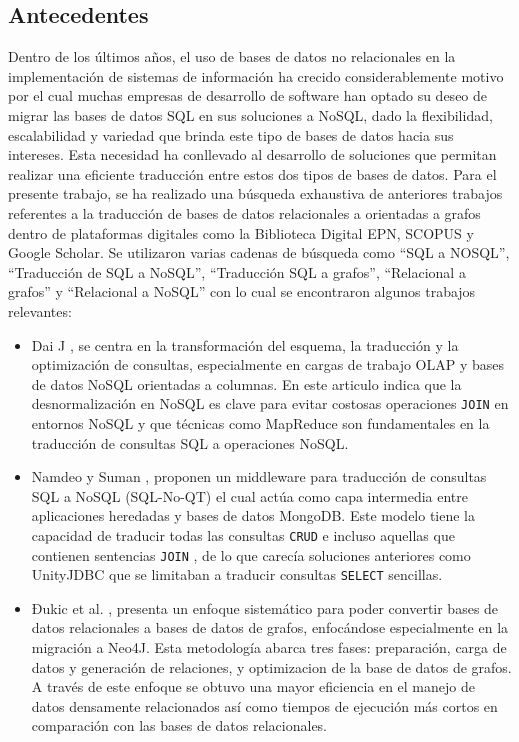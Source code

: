 \subsection{Antecedentes}
Dentro de los últimos años, el uso de bases de datos no relacionales en la implementación de sistemas de información ha crecido considerablemente motivo por el cual muchas empresas de desarrollo de software han optado su deseo de migrar las bases de datos SQL en sus soluciones a NoSQL, dado la flexibilidad, escalabilidad y variedad que brinda este tipo de bases de datos hacia sus intereses. Esta necesidad ha conllevado al desarrollo de soluciones que permitan realizar una eficiente traducción entre estos dos tipos de bases de datos.
Para el presente trabajo, se ha realizado una búsqueda exhaustiva de anteriores trabajos referentes a la traducción de bases de datos relacionales a orientadas a grafos dentro de plataformas digitales como la Biblioteca Digital EPN, SCOPUS y Google Scholar. Se utilizaron varias cadenas de búsqueda como ``SQL a NOSQL'', ``Traducción de SQL a NoSQL'', ``Traducción SQL a grafos'', ``Relacional a grafos'' y ``Relacional a NoSQL'' con lo cual se encontraron algunos trabajos relevantes:

\begin{itemize}
\item Dai J \cite{dai2019sql}, se centra en la transformación del esquema, la traducción y la optimización de consultas, especialmente en cargas de trabajo OLAP y bases de datos NoSQL orientadas a columnas. En este articulo indica que la desnormalización en NoSQL es clave para evitar costosas operaciones \verb|JOIN| en entornos NoSQL y que técnicas como MapReduce son fundamentales en la traducción de consultas SQL a operaciones NoSQL.
    \item Namdeo y Suman \cite{namdeo2022middleware}, proponen un middleware para traducción de consultas SQL a NoSQL (SQL-No-QT) el cual actúa como capa intermedia entre aplicaciones heredadas y bases de datos MongoDB.  Este modelo tiene la capacidad de traducir todas las consultas \verb|CRUD| e incluso aquellas que contienen sentencias \verb|JOIN| , de lo que carecía soluciones anteriores como UnityJDBC que se limitaban a traducir consultas \verb|SELECT| sencillas.
    \item Đukic et al. \cite{djukic2024systematic}, presenta un enfoque sistemático para poder convertir bases de datos relacionales a bases de datos de grafos, enfocándose especialmente en la migración a Neo4J. Esta metodología abarca tres fases: preparación, carga de datos y generación de relaciones, y optimizacion de la base de datos de grafos. A través de este enfoque se obtuvo una mayor eficiencia en el manejo de datos densamente relacionados así como tiempos de ejecución más cortos en comparación con las bases de datos relacionales.
\end{itemize}

